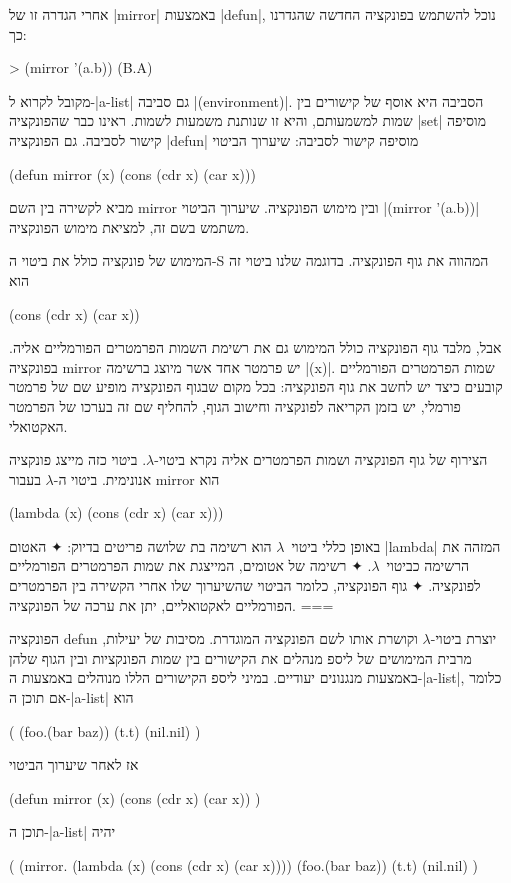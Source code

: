 אחרי הגדרה זו של \E|mirror| באמצעות \E|defun|, נוכל להשתמש בפונקציה החדשה
שהגדרנו כך:
\begin{LISP}
> (mirror '(a.b))
(B.A)
\end{LISP}

מקובל לקרוא ל-\E|a-list| גם סביבה \E|(environment)|. הסביבה היא אוסף של קישורים
בין שמות למשמעותם, והיא זו שנותנת משמעות לשמות. ראינו כבר שהפונקציה \E|set|
מוסיפה קישור לסביבה. גם הפונקציה \E|defun| מוסיפה קישור לסביבה: שיערוך הביטוי
\begin{LISP}
(defun mirror (x) (cons (cdr x) (car x)))
\end{LISP}
מביא לקשירה בין השם mirror ובין מימוש הפונקציה. שיערוך הביטוי \T|(mirror
'(a.b))| משתמש בשם זה, למציאת מימוש הפונקציה.

המימוש של פונקציה כולל את ביטוי ה-S המהווה את גוף הפונקציה. בדוגמה שלנו ביטוי
זה הוא
\begin{LISP}
(cons (cdr x) (car x))
\end{LISP}
אבל, מלבד גוף הפונקציה כולל המימוש גם את רשימת השמות הפרמטרים הפורמליים אליה.
בפונקציה mirror יש פרמטר אחד אשר מיוצג ברשימה \T|(x)|. שמות הפרמטרים הפורמליים
קובעים כיצד יש לחשב את גוף הפונקציה: בכל מקום שבגוף הפונקציה מופיע שם של פרמטר
פורמלי, יש בזמן הקריאה לפונקציה וחישוב הגוף, להחליף שם זה בערכו של הפרמטר
האקטואלי.

הצירוף של גוף הפונקציה ושמות הפרמטרים אליה נקרא ביטוי-$λ$. ביטוי כזה
מייצג פונקציה אנונימית. ביטוי ה-$λ$ בעבור mirror הוא
\begin{LISP}
  (lambda (x) (cons (cdr x) (car x)))
\end{LISP}
באופן כללי ביטוי~$λ$ הוא רשימה בת שלושה פריטים בדיוק:
✦ האטום \T|lambda| המזהה את הרשימה כביטוי~$λ$.
✦ רשימה של אטומים, המייצגת את שמות הפרמטרים הפורמליים לפונקציה.
✦ גוף הפונקציה, כלומר הביטוי שהשיערוך שלו אחרי הקשירה בין הפרמטרים
הפורמליים לאקטואליים, יתן את ערכה של הפונקציה.
===

הפונקציה defun יוצרת ביטוי-$λ$ וקושרת אותו לשם הפונקציה המוגדרת. מסיבות של
יעילות, מרבית המימושים של ליספ מנהלים את הקישורים בין שמות הפונקציות ובין הגוף
שלהן באמצעות מנגנונים יעודיים. במיני ליספ הקישורים הללו מנוהלים באמצעות
ה-\E|a-list|, כלומר אם תוכן ה-\E|a-list| הוא
\begin{LISP}
(
  (foo.(bar baz))
  (t.t)
  (nil.nil)
)
\end{LISP}
\begin{minipage}\linewidth
אז לאחר שיערוך הביטוי
\begin{LISP}
(defun
  mirror (x)
  (cons (cdr x) (car x))
)
\end{LISP}
תוכן ה-\E|a-list| יהיה
\begin{LISP}
(
  (mirror.
     (lambda (x)
        (cons (cdr x) (car x))))
  (foo.(bar baz))
  (t.t)
  (nil.nil)
)
\end{LISP}
\end{minipage}

